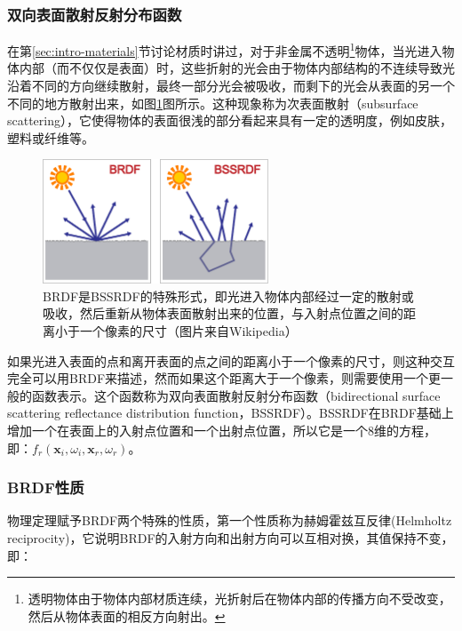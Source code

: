\subsubsection{双向表面散射反射分布函数}
在第\ref{sec:intro-materials}节讨论材质时讲过，对于非金属不透明\footnote{透明物体由于物体内部材质连续，光折射后在物体内部的传播方向不受改变，然后从物体表面的相反方向射出。}物体，当光进入物体内部（而不仅仅是表面）时，这些折射的光会由于物体内部结构的不连续导致光沿着不同的方向继续散射，最终一部分光会被吸收，而剩下的光会从表面的另一个不同的地方散射出来，如图\ref{f:intro-bssrdf-1}图所示。这种现象称为次表面散射（subsurface scattering），它使得物体的表面很浅的部分看起来具有一定的透明度，例如皮肤，塑料或纤维等。

\begin{figure}
	\sidecaption
	\includegraphics[width=0.6\textwidth]{figures/intro/BSSDF}
	\caption{BRDF是BSSRDF的特殊形式，即光进入物体内部经过一定的散射或吸收，然后重新从物体表面散射出来的位置，与入射点位置之间的距离小于一个像素的尺寸（图片来自Wikipedia）}
	\label{f:intro-bssrdf-1}
\end{figure}

如果光进入表面的点和离开表面的点之间的距离小于一个像素的尺寸，则这种交互完全可以用BRDF来描述，然而如果这个距离大于一个像素，则需要使用一个更一般的函数表示。这个函数称为双向表面散射反射分布函数（bidirectional surface scattering reflectance distribution function，BSSRDF）\cite{a:GeometricConsiderationsandNomenclatureforReflectance}。BSSRDF在BRDF基础上增加一个在表面上的入射点位置和一个出射点位置，所以它是一个8维的方程，即：$f_r(\mathbf{x}_i,\omega_i,\mathbf{x}_r,\omega_r)$。




\subsubsection{BRDF性质}
物理定理赋予BRDF两个特殊的性质，第一个性质称为赫姆霍兹互反律(Helmholtz reciprocity)，它说明BRDF的入射方向和出射方向可以互相对换，其值保持不变，即：

